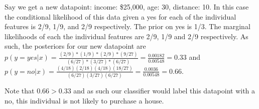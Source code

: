Say we get a new datapoint: income: \$25,000, age: 30, distance: 10. In this
case the conditional likelihood of this data given a yes for each of the
individual features is 2/9, 1/9, and 2/9 respectively. The prior on yes is 1/3.
The marginal likelihoods of each the individual features are 2/9, 1/9 and 2/9
respectively. As such, the posteriors for our new datapoint are
$p(y=yes|x)=\frac{(2/9)*(1/9)*(2/9)*(9/27)}{(6/27)*(3/27)*(6/27)} = \frac{0.00182}{0.00548} = 0.33$ and $p(y=no|x)=\frac{(4/18)(2/18)(4/18)(18/27)}{(6/27)(3/27)(6/27)} = \frac{0.0036}{0.00548} = 0.66$.

Note that $0.66 > 0.33$ and as such our classifier would label this datapoint
with a no, this individual is not likely to purchase a house.

